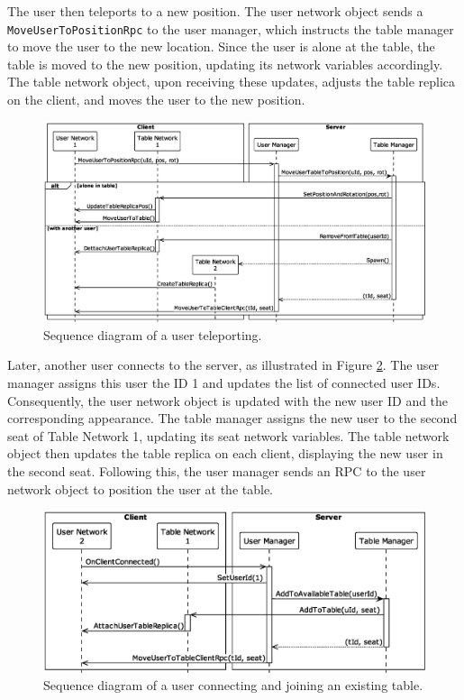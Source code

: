         The user then teleports to a new position. The user network object sends a \lstinline{MoveUserTo}\lstinline{PositionRpc} to the user manager, which instructs the table manager to move the user to the new location. Since the user is alone at the table, the table is moved to the new position, updating its network variables accordingly. The table network object, upon receiving these updates, adjusts the table replica on the client, and moves the user to the new position.

        \begin{figure}[h]
            \centering
            \includegraphics[width=.85\linewidth]{diagrams/out/teleport.eps}
            \caption{Sequence diagram of a user teleporting.}
            \label{fig:teleport}
        \end{figure}

        Later, another user connects to the server, as illustrated in Figure \ref{fig:connect_and_join}. The user manager assigns this user the ID 1 and updates the list of connected user IDs. Consequently, the user network object is updated with the new user ID and the corresponding appearance. The table manager assigns the new user to the second seat of Table Network 1, updating its seat network variables. The table network object then updates the table replica on each client, displaying the new user in the second seat. Following this, the user manager sends an RPC to the user network object to position the user at the table.

        \begin{figure}[ht!]
            \centering
            \includegraphics[width=.85\linewidth]{diagrams/out/connect_and_join_existing_table.eps}
            \caption{Sequence diagram of a user connecting and joining an existing table.}
            \label{fig:connect_and_join}
        \end{figure}

